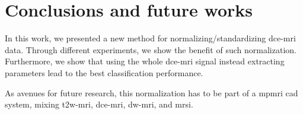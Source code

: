 \section{Conclusions and future works}\label{sec:conclusions}

In this work, we presented a new method for normalizing/standardizing \ac{dce}-\ac{mri} data.
Through different experiments, we show the benefit of such normalization.
Furthermore, we show that using the whole \ac{dce}-\ac{mri} signal instead extracting parameters lead to the best classification performance.

As avenues for future research, this normalization has to be part of a \ac{mpmri} \ac{cad} system, mixing \ac{t2w}-\ac{mri}, \ac{dce}-\ac{mri}, \ac{dw}-\ac{mri}, and \ac{mrsi}.

